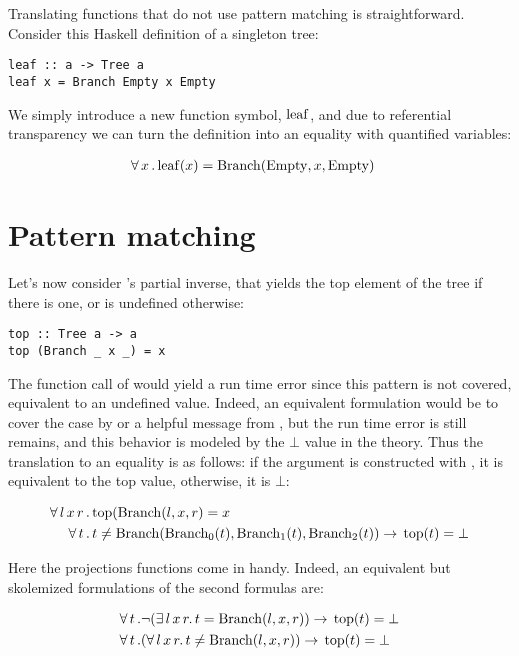 Translating functions that do not use pattern matching is
straightforward. Consider this Haskell definition of a singleton tree:

\begin{verbatim}
leaf :: a -> Tree a
leaf x = Branch Empty x Empty
\end{verbatim}

We simply introduce a new function symbol, $\mathrm{leaf}$, and due
to referential transparency we can turn the definition into an
equality with quantified variables:

\begin{align*}
 \forall \, x \, . \, \mathrm{leaf}(x) &  = \mathrm{Branch}(\mathrm{Empty},x,\mathrm{Empty})
\end{align*}

\section{Pattern matching}

Let's now consider 's partial inverse,  that
yields the top element of the tree if there is one, or is undefined
otherwise:

\begin{verbatim}
top :: Tree a -> a
top (Branch _ x _) = x
\end{verbatim}

The function call of  would yield a run time error
since this pattern is not covered, equivalent to an undefined
value. Indeed, an equivalent formulation would be to cover the
 case by  or a helpful message from
, but the run time error is still remains, and this
behavior is modeled by the $\bot$ value in the theory. Thus the
translation to an equality is as follows: if the argument is
constructed with , it is equivalent to the top value,
otherwise, it is $\bot$:

\begin{align*}
 \forall \, l \, x \, r \, & . \, \mathrm{top}(\mathrm{Branch}(l,x,r) = x\\
 \forall \, t \, & . \, t \neq
 \mathrm{Branch}(\mathrm{Branch_{0}}(t),\mathrm{Branch_{1}}(t),\mathrm{Branch_{2}}(t))
 \rightarrow \, \mathrm{top}(t)  = \mathrm{\bot}
\end{align*}

Here the projections functions come in handy. Indeed, an equivalent
but skolemized formulations of the second formulas are:

\begin{align*}
 \forall \, t \, & . \neg (\exists \, l \, x \, r . \, t =
 \mathrm{Branch}(l,x,r))
 \rightarrow \, \mathrm{top}(t) = \bot \\
 \forall \, t \, & . (\forall \, l \, x \, r . \, t \neq
 \mathrm{Branch}(l,x,r))
 \rightarrow \, \mathrm{top}(t) = \bot
\end{align*}

